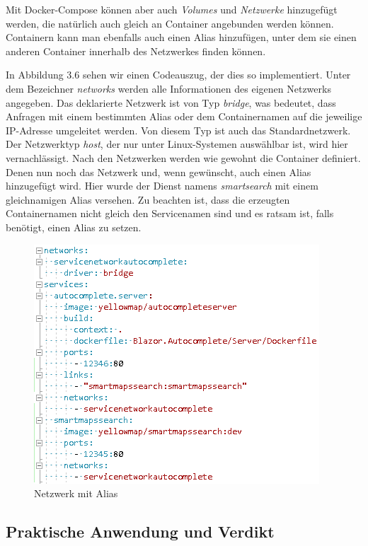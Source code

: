 \documentclass[12pt,a4paper]{scrartcl}
\begin{document}
Mit Docker-Compose können aber auch \emph{Volumes} und \emph{Netzwerke} hinzugefügt werden, die natürlich auch gleich an Container angebunden werden können.
Containern kann man ebenfalls auch einen Alias hinzufügen, unter dem sie einen anderen Container innerhalb des Netzwerkes finden können. 

In Abbildung 3.6 sehen wir einen Codeauszug, der dies so implementiert. Unter dem Bezeichner \emph{networks} werden alle Informationen des eigenen Netzwerks angegeben. Das deklarierte Netzwerk ist von Typ \emph{bridge}, was bedeutet, dass Anfragen mit einem bestimmten Alias oder dem Containernamen auf die jeweilige IP-Adresse umgeleitet werden. Von diesem Typ ist auch das Standardnetzwerk. Der Netzwerktyp \emph{host}, der nur unter Linux-Systemen auswählbar ist, wird hier vernachlässigt. Nach den Netzwerken werden wie gewohnt die Container definiert. Denen nun noch das Netzwerk und, wenn gewünscht, auch einen Alias hinzugefügt wird. Hier wurde der Dienst namens \emph{smartsearch} mit einem gleichnamigen Alias versehen. Zu beachten ist, dass die erzeugten Containernamen nicht gleich den Servicenamen sind und es ratsam ist, falls benötigt, einen Alias zu setzen.

\begin{figure}[h!]
	\centering
	\includegraphics[scale=1]{DockerComposeNetwork.png}
	\caption[Netzwerk mit Alias]{Netzwerk mit Alias}
\end{figure}

\subsection{Praktische Anwendung und Verdikt}
\end{document}
